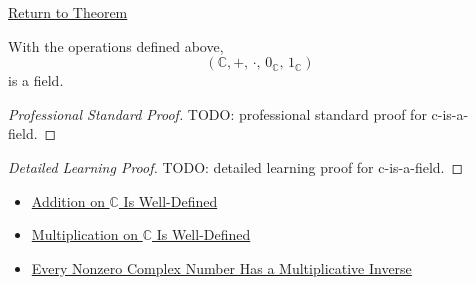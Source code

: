 \newpage
{}
\label{prf:c-is-a-field}

\begin{remark*}[Return]
\hyperref[thm:c-is-a-field]{Return to Theorem}
\end{remark*}

\begin{theorem*}[$C$ Is a Field]
With the operations defined above,
\[
(\mathbb{C},+,\,\cdot,\,0_{\mathbb{C}},\,1_{\mathbb{C}})
\]
is a field.
\end{theorem*}

\begin{proof}[Professional Standard Proof]
\LRAProofBodyStart
TODO: professional standard proof for c-is-a-field.
\end{proof}

\begin{proof}[Detailed Learning Proof]
\LRAProofBodyStart
TODO: detailed learning proof for c-is-a-field.
\end{proof}

\begin{remark*}
\end{remark*}

\begin{dependencies}
\begin{itemize}
  \item \hyperref[thm:addition-on-c-well-defined]{Addition on $\mathbb{C}$ Is Well-Defined}
  \item \hyperref[thm:multiplication-on-c-well-defined]{Multiplication on $\mathbb{C}$ Is Well-Defined}
  \item \hyperref[thm:every-nonzero-complex-has-inverse]{Every Nonzero Complex Number Has a Multiplicative Inverse}
\end{itemize}
\end{dependencies}

\clearpage
